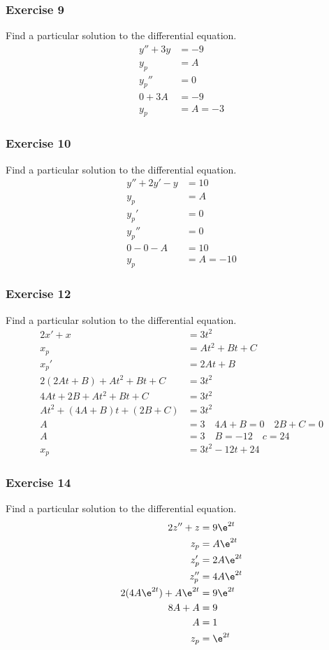 \documentclass{math}
\begin{document}
\subsubsection*{Exercise 9}
Find a particular solution to the differential equation.
\begin{align*}
  y''+3y &= -9 \\
  y_p &= A \\
  y_p'' &= 0 \\
  0+3A &= -9 \\
  y_p &= A = -3
\end{align*}

\subsubsection*{Exercise 10}
Find a particular solution to the differential equation.
\begin{align*}
  y''+2y'-y &= 10 \\
  y_p &= A \\
  y_p' &= 0 \\
  y_p'' &= 0 \\
  0-0-A &= 10 \\
  y_p &= A = -10
\end{align*}

\subsubsection*{Exercise 12}
Find a particular solution to the differential equation.
\begin{align*}
  2x'+x &= 3t^2 \\
  x_p &= At^2+Bt+C \\
  x_p' &= 2At+B \\
  2(2At+B)+At^2+Bt+C &= 3t^2 \\
  4At+2B+At^2+Bt+C &= 3t^2 \\
  At^2+(4A+B)t+(2B+C) &= 3t^2 \\
  A &= 3 \quad 4A+B = 0 \quad 2B+C = 0 \\
  A &= 3 \quad B = -12 \quad c = 24 \\
  x_p &= 3t^2-12t+24
\end{align*}

\subsubsection*{Exercise 14}
Find a particular solution to the differential equation.
\begin{align*}
  2z''+z &= 9\e^{2t} \\
  z_p &= A\e^{2t} \\
  z_p' &= 2A\e^{2t} \\
  z_p'' &= 4A\e^{2t} \\
  2(4A\e^{2t})+A\e^{2t} &= 9\e^{2t} \\
  8A+A &= 9 \\
  A &= 1 \\
  z_p &= \e^{2t}
\end{align*}
\end{document}
